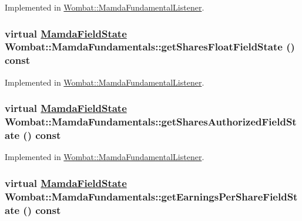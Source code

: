 Implemented in \hyperlink{classWombat_1_1MamdaFundamentalListener_0115bc828235b93375c1c3a53d8bada9}{Wombat::Mamda\-Fundamental\-Listener}.\hypertarget{classWombat_1_1MamdaFundamentals_bda054b607ae27172a2aea4b25224853}{
\subsubsection[getSharesFloatFieldState]{\setlength{\rightskip}{0pt plus 5cm}virtual \hyperlink{namespaceWombat_93aac974f2ab713554fd12a1fa3b7d2a}{Mamda\-Field\-State} Wombat::Mamda\-Fundamentals::get\-Shares\-Float\-Field\-State () const}}
\label{classWombat_1_1MamdaFundamentals_bda054b607ae27172a2aea4b25224853}




Implemented in \hyperlink{classWombat_1_1MamdaFundamentalListener_936931460f7e4cb720e366b5a4eab60f}{Wombat::Mamda\-Fundamental\-Listener}.\hypertarget{classWombat_1_1MamdaFundamentals_3b2e1c2ff2ec88902f4e9c7b127852cc}{
\subsubsection[getSharesAuthorizedFieldState]{\setlength{\rightskip}{0pt plus 5cm}virtual \hyperlink{namespaceWombat_93aac974f2ab713554fd12a1fa3b7d2a}{Mamda\-Field\-State} Wombat::Mamda\-Fundamentals::get\-Shares\-Authorized\-Field\-State () const}}
\label{classWombat_1_1MamdaFundamentals_3b2e1c2ff2ec88902f4e9c7b127852cc}




Implemented in \hyperlink{classWombat_1_1MamdaFundamentalListener_4c92c5309a8a142cc95541447c4c1403}{Wombat::Mamda\-Fundamental\-Listener}.\hypertarget{classWombat_1_1MamdaFundamentals_e7eef94f859304d1fee6183dcef41680}{
\subsubsection[getEarningsPerShareFieldState]{\setlength{\rightskip}{0pt plus 5cm}virtual \hyperlink{namespaceWombat_93aac974f2ab713554fd12a1fa3b7d2a}{Mamda\-Field\-State} Wombat::Mamda\-Fundamentals::get\-Earnings\-Per\-Share\-Field\-State () const}}
\label{classWombat_1_1MamdaFundamentals_e7eef94f859304d1fee6183dcef41680}




